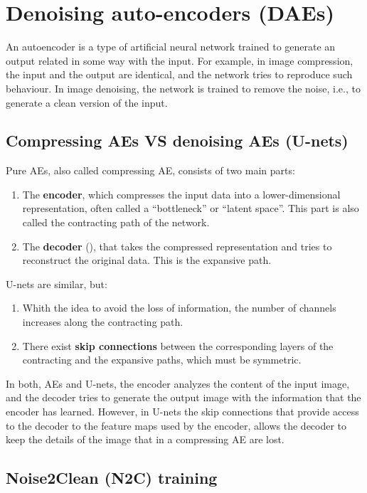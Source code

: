 \chapter{Denoising auto-encoders (DAEs)}

An autoencoder is a type of artificial neural network trained to generate an output related in some way with the input. For example, in image compression, the input and the output are identical, and the network tries to reproduce such behaviour. In image denoising, the network is trained to remove the noise, i.e., to generate a clean version of the input.

\section{Compressing AEs VS denoising AEs (U-nets)}

Pure AEs, also called compressing AE, consists of two main parts:
\begin{enumerate}
\item The \textbf{encoder}, which compresses the
  input data into a lower-dimensional representation, often called a
  ``bottleneck'' or ``latent space''. This part is also called the
  contracting path of the network.
\item The \textbf{decoder} (), that takes the compressed representation
  and tries to reconstruct the original data. This is the expansive path.
\end{enumerate}

U-nets are similar, but:
\begin{enumerate}
\item Whith the idea to avoid the loss of information, the number of
  channels increases along the contracting path.
\item There exist \textbf{skip connections} between the corresponding
  layers of the contracting and the expansive paths, which must be
  symmetric.
\end{enumerate}

In both, AEs and U-nets, the encoder analyzes the content of the input
image, and the decoder tries to generate the output image with the
information that the encoder has learned. However, in U-nets the skip
connections that provide access to the decoder to the feature maps
used by the encoder, allows the decoder to keep the details of the
image that in a compressing AE are lost.

\section{Noise2Clean (N2C) training}


